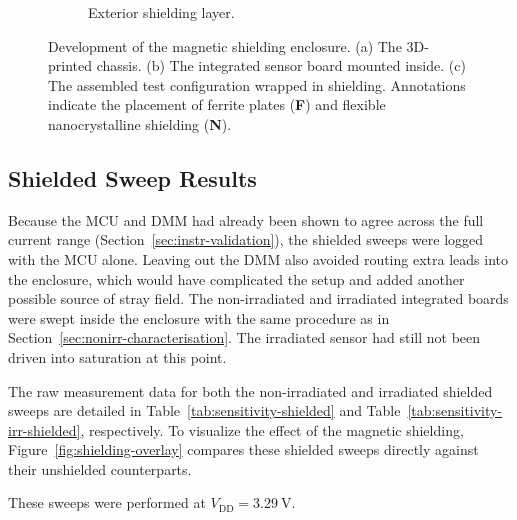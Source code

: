 \documentclass[12pt,a4paper]{article}
\begin{document}
\begin{figure}[H]
\begin{subfigure}[b]{0.32\textwidth}
        \caption{Exterior shielding layer.}
        \label{fig:box_nano}
    \end{subfigure}
    
    \caption{Development of the magnetic shielding enclosure. (a) The 3D-printed chassis. (b) The integrated sensor board mounted inside. (c) The assembled test configuration wrapped in shielding. Annotations indicate the placement of ferrite plates (\textbf{F}) and flexible nanocrystalline shielding (\textbf{N}).} 
    \label{fig:shielding_enclosure}
\end{figure}
    

\subsection{Shielded Sweep Results}
\label{sec:shielded-results}

Because the MCU and DMM had already been shown to agree across the full current range (Section~\ref{sec:instr-validation}), the shielded sweeps were logged with the MCU alone. Leaving out the DMM also avoided routing extra leads into the enclosure, which would have complicated the setup and added another possible source of stray field. The non-irradiated and irradiated integrated boards were swept inside the enclosure with the same procedure as in Section~\ref{sec:nonirr-characterisation}. The irradiated sensor had still not been driven into saturation at this point.

The raw measurement data for both the non-irradiated and irradiated shielded sweeps are detailed in Table~\ref{tab:sensitivity-shielded} and Table~\ref{tab:sensitivity-irr-shielded}, respectively. To visualize the effect of the magnetic shielding, Figure~\ref{fig:shielding-overlay} compares these shielded sweeps directly against their unshielded counterparts.

These sweeps were performed at $V_{\text{DD}} = \SI{3.29}{\volt}$.
\end{document}
